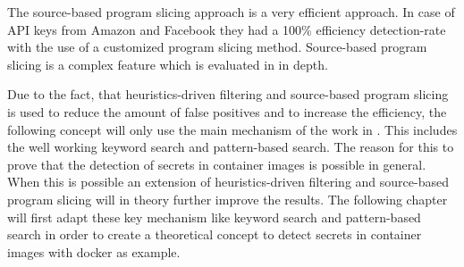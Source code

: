 The source-based program slicing approach is a very efficient approach. In case of API keys from Amazon and Facebook they had a 100\% efficiency detection-rate with the use of a customized program slicing method. Source-based program slicing is a complex feature which is evaluated in \cite{z3} in depth. 

Due to the fact, that heuristics-driven filtering and source-based program slicing is used to reduce the amount of false positives and to increase the efficiency, the following concept will only use the main mechanism of the work in  \cite{7180102}. This includes the well working keyword search and pattern-based search. The reason for this to prove that the detection of secrets in container images is possible in general. When this is possible an extension of heuristics-driven filtering and source-based program slicing will in theory further improve the results. 
The following chapter will first adapt these key mechanism like keyword search and pattern-based search in order to create a theoretical concept to detect secrets in container images with docker as example.

%
%


